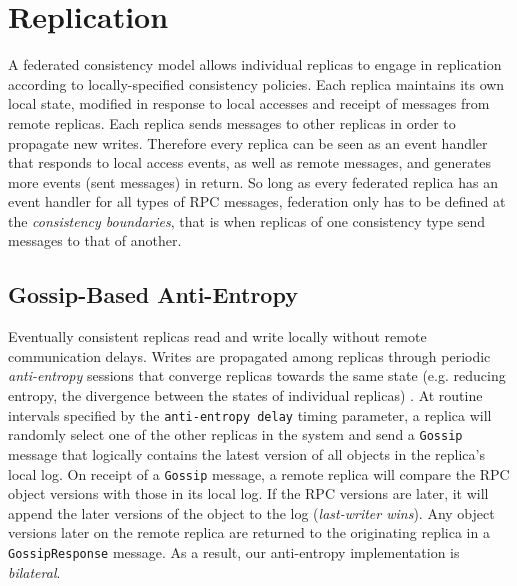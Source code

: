 \documentclass[10pt,conference,letterpaper]{IEEEtran}
\begin{document}
\section{Replication}
\label{sec:replication}
A federated consistency model allows individual replicas to
engage in replication according to locally-specified consistency policies.
Each replica maintains its own local state, modified in response to local accesses
and receipt of messages from remote replicas.
Each replica sends messages to other replicas in order to propagate new writes.
Therefore every replica can be seen as an event handler that responds to local access
events, as well as remote messages, and generates more events (sent messages) in return.
So long as every federated replica has an event handler for all types of RPC
messages, federation only has to be defined at the \textit{consistency boundaries}, that
is when replicas of one consistency type send messages to that of another.


\subsection{Gossip-Based Anti-Entropy}

Eventually consistent replicas  read and write locally without remote communication delays.
Writes are propagated among replicas through
periodic \textit{anti-entropy} sessions that
converge replicas towards the same state (e.g.
reducing entropy, the divergence between the states of individual replicas)
\cite{kempe_gossip-based_2003}.
At routine intervals specified by the \texttt{anti-entropy delay} timing parameter, a
replica will randomly select one of the other replicas in the system and send a
\texttt{Gossip} message that logically contains the latest version of all objects in the replica's
local log.
On receipt of a \texttt{Gossip} message, a remote replica will compare the RPC object
versions with those in its local log.
If the RPC versions are later, it will append the later versions of the object to the log
(\textit{last-writer wins}).
Any object versions later on the remote replica are returned to the
originating replica in a \texttt{GossipResponse} message.
As a result, our anti-entropy implementation is \textit{bilateral}.
\end{document}
